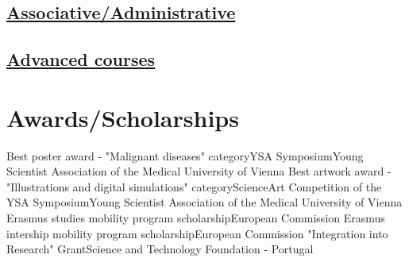 \documentclass[11pt,a4paper,roman]{moderncv} %
\begin{document}
    \subsection{\underline{Associative/Administrative}}


    \subsection{\underline{Advanced courses}}


\section{Awards/Scholarships}

        {Best poster award - "Malignant diseases" category}{YSA Symposium}{}{}{Young Scientist Association of the Medical University of Vienna}
        {Best artwork award - "Illustrations and digital simulations" category}{Science\│Art Competition of the YSA Symposium}{}{}{Young Scientist Association of the Medical University of Vienna}
        {Erasmus studies mobility program scholarship}{}{}{}{European Commission}
        {Erasmus intership mobility program scholarship}{}{}{}{European Commission}
        {"Integration into Research" Grant}{}{}{}{Science and Technology Foundation - Portugal}

\end{document}
